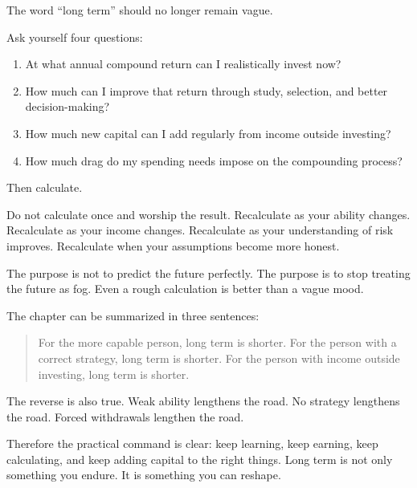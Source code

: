 The word ``long term'' should no longer remain vague.

Ask yourself four questions:

\begin{enumerate}
\item At what annual compound return can I realistically invest now?
\item How much can I improve that return through study, selection, and better decision-making?
\item How much new capital can I add regularly from income outside investing?
\item How much drag do my spending needs impose on the compounding process?
\end{enumerate}

Then calculate.

Do not calculate once and worship the result. Recalculate as your ability changes. Recalculate as your income changes. Recalculate as your understanding of risk improves. Recalculate when your assumptions become more honest.

The purpose is not to predict the future perfectly. The purpose is to stop treating the future as fog. Even a rough calculation is better than a vague mood.

The chapter can be summarized in three sentences:

\begin{quote}
For the more capable person, long term is shorter. For the person with a correct strategy, long term is shorter. For the person with income outside investing, long term is shorter.
\end{quote}

The reverse is also true. Weak ability lengthens the road. No strategy lengthens the road. Forced withdrawals lengthen the road.

Therefore the practical command is clear: keep learning, keep earning, keep calculating, and keep adding capital to the right things. Long term is not only something you endure. It is something you can reshape.
